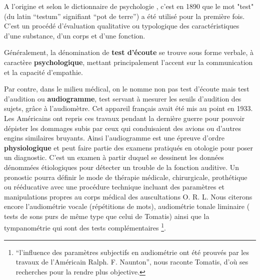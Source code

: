 A l'origine et selon le dictionnaire de psychologie \autocite {doronparot}, c'est en 1890 que le mot "test" (du latin ``testum''
signifiant ``pot de terre'') a été utilisé pour la
première fois. C'est un procédé d'évaluation qualitative ou
typologique des caractéristiques d'une substance, d'un corps et d'une
fonction.

Généralement, la dénomination de \textbf{test d'écoute} se trouve sous forme verbale,
à caractère
\textbf{psychologique}, mettant principalement l'accent sur la communication
et la capacité d'empathie.


Par contre, dans le milieu médical, on le nomme non pas test d'écoute mais test d'audition ou \textbf{audiogramme}, test servant à mesurer les seuils d'audition des sujets, grâce à l'audiomètre. Cet
appareil français avait été mis au point en 1933. Les Américains
ont repris ces travaux pendant la dernière guerre pour pouvoir dépister
les dommages subis par ceux qui conduisaient des avions ou d'autres
engins similaires bruyants.
Ainsi l'audiogramme est une épreuve d'ordre \textbf{physiologique} et peut faire partie des examens  pratiqués en otologie
pour poser un diagnostic.
   C'est un examen à partir duquel se
  dessinent les données dénommées étiologiques
  pour détecter un trouble de la fonction auditive. Un pronostic pourra définir le mode de thérapie
médicale, chirurgicale, prothétique ou rééducative avec une procédure
technique incluant des paramètres et manipulations propres au corps
médical des auscultations O. R. L.
Nous citerons encore l'audiométrie vocale (répétitions de mots), audiométrie tonale liminaire ( tests de 
sons purs de même type que celui de Tomatis) ainsi que la tympanométrie qui sont des tests 
complémentaires \autocite {audiogramme}
\footnote{\enquote {l'influence des paramètres subjectifs en audiométrie ont été prouvés par les travaux 
de l'Américain Ralph. F. Naunton}, nous raconte Tomatis,\autocite[69] {tomatisoreilletvie} d'où ses 
recherches pour la rendre plus objective.}.

